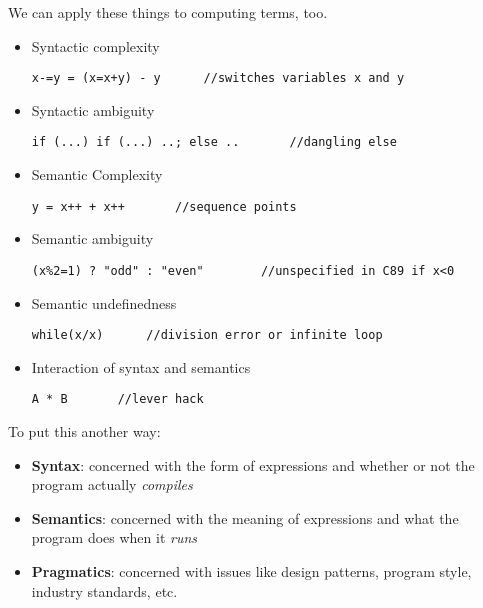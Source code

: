 \documentclass[11pt,a4paper,titlepage,dvipsnames,cmyk]{scrartcl}
\begin{document}
We can apply these things to computing terms, too.
\begin{itemize}
    \item Syntactic complexity
            \begin{lstlisting}
x-=y = (x=x+y) - y      //switches variables x and y
            \end{lstlisting}
    \item Syntactic ambiguity
\begin{lstlisting}
if (...) if (...) ..; else ..       //dangling else
\end{lstlisting}
        \item Semantic Complexity
\begin{lstlisting}
y = x++ + x++       //sequence points
\end{lstlisting}
        \item Semantic ambiguity
\begin{lstlisting}
(x%2=1) ? "odd" : "even"        //unspecified in C89 if x<0
\end{lstlisting}
            \item Semantic undefinedness
\begin{lstlisting}
while(x/x)      //division error or infinite loop
\end{lstlisting}
            \item Interaction of syntax and semantics
\begin{lstlisting}
A * B       //lever hack
\end{lstlisting}

\end{itemize}

To put this another way:
\begin{itemize}
    \item \textbf{Syntax}: concerned with the form of expressions and
        whether or not the program actually \textit{compiles}
    \item \textbf{Semantics}: concerned with the meaning of expressions
        and what the program does when it \textit{runs}
    \item \textbf{Pragmatics}: concerned with issues like design patterns,
        program style, industry standards, etc.
\end{itemize}
\end{document}
